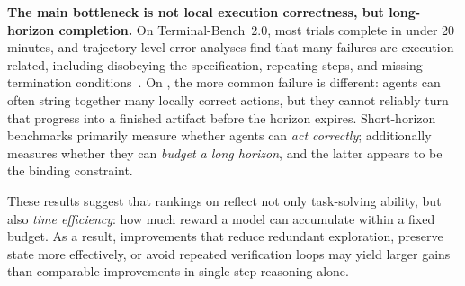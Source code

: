 \textbf{The main bottleneck is not local execution correctness, but long-horizon completion.}
On Terminal-Bench~2.0, most trials complete in under 20 minutes, and trajectory-level error analyses find that many failures are execution-related, including disobeying the specification, repeating steps, and missing termination conditions~\citep{merrill2026terminalbenchbenchmarkingagentshard}.
%
On \ours{}, the more common failure is different: agents can often string together many locally correct actions, but they cannot reliably turn that progress into a finished artifact before the horizon expires.
%
Short-horizon benchmarks primarily measure whether agents can \emph{act correctly}; \ours{} additionally measures whether they can \emph{budget a long horizon}, and the latter appears to be the binding constraint.


These results suggest that rankings on \ours{} reflect not only task-solving ability, but also \emph{time efficiency}: how much reward a model can accumulate within a fixed budget.
%
As a result, improvements that reduce redundant exploration, preserve state more effectively, or avoid repeated verification loops may yield larger gains than comparable improvements in single-step reasoning alone.


% 




